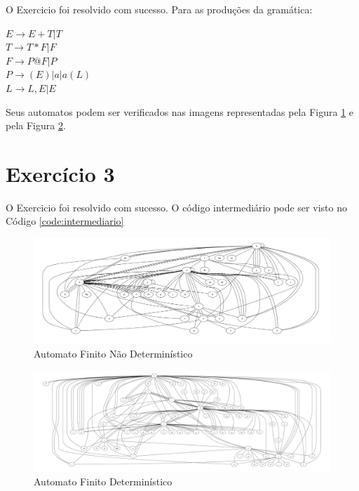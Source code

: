 \documentclass[a4paper, 10pt]{article}
\begin{document}
O Exercicio foi resolvido com sucesso. Para as produções da gramática:
\begin{center}
    $E  \to  E + T | T$ \\
    $T  \to  T * F | F$ \\
    $F  \to  P @ F | P$ \\
    $P  \to  ( E ) | a | a ( L )$ \\
    $L  \to  L , E | E$ \\
\end{center}
Seus automatos podem ser verificados nas imagens representadas pela Figura \ref{fig:naodeterministico} e pela Figura \ref{fig:deterministico}.

\section*{Exercício 3}

O Exercicio foi resolvido com sucesso. O código intermediário pode ser visto no Código \ref{code:intermediario}



\begin{figure}[H]
  \begin{center}
  \includegraphics[width=\linewidth]{./../nao_deterministico.png}
  \caption{Automato Finito Não Determinístico}
  \label{fig:naodeterministico}
  \end{center}
\end{figure}

\begin{figure}[H]
  \begin{center}
  \includegraphics[width=\linewidth]{./../deterministico.png}
  \caption{Automato Finito Determinístico}
  \label{fig:deterministico}
  \end{center}
\end{figure}

\end{document}
